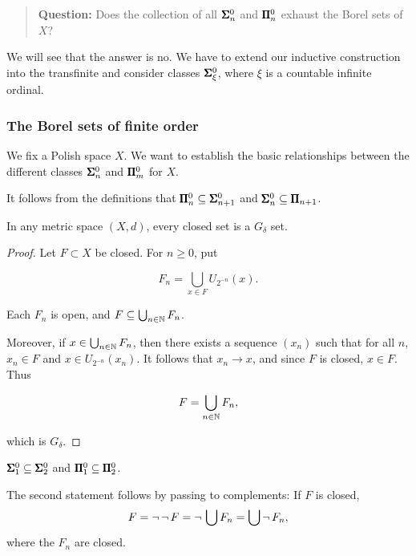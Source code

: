 \begin{quote}
\textbf{Question:} Does the collection of all $\pmb{\Sigma}^0_n$ and $\pmb{\Pi}^0_n$ exhaust the Borel sets of $X$?
\end{quote}

We will see that the answer is no. We have to extend our inductive construction into the transfinite and consider classes $\pmb{\Sigma}^0_\xi$, where $\xi$ is a countable infinite ordinal.

\subsubsection{The Borel sets of finite order}

We fix a Polish space $X$. We want to establish the basic relationships between the different classes $\pmb{\Sigma}^0_n$ and $\pmb{\Pi}^0_m$ for $X$.

It follows from the definitions that $\pmb{\Pi}^0_n \subseteq \pmb{\Sigma}^0_{n+1}$ and $\pmb{\Sigma}^0_n \subseteq \pmb{\Pi}_{n+1}$.

\begin{lemma}\label{closed-is-gdelta}In any metric space $(X,d)$, every closed set is a $G_\delta$ set.

\end{lemma}\begin{proof}Let $F \subset X$ be closed. For $n \geq 0$, put

\begin{equation}
F_n = \bigcup_{x \in F} U_{2^{-n}}(x).
\end{equation}

Each $F_n$ is open, and $F \subseteq \bigcup_{n \in \mathbb{N}} F_n$.

Moreover, if $x \in \bigcup_{n \in \mathbb{N}} F_n$, then there exists a sequence $(x_n)$ such that for all $n$, $x_n \in F$ and $x \in U_{2^{ -n}}(x_n)$. It follows that $x_n \to x$, and since $F$ is closed, $x\in F$. Thus

\begin{equation}
F = \bigcup_{n \in \mathbb{N}} F_n,
\end{equation}

which is $G_\delta$.

\end{proof}\begin{corollary}\label{cor-weak-borel-hierarchy-1}$\pmb{\Sigma}^0_1 \subseteq \pmb{\Sigma}^0_2$ and $\pmb{\Pi}^0_1 \subseteq \pmb{\Pi}^0_2$.

\end{corollary}The second statement follows by passing to complements: If $F$ is closed,
\begin{equation*}
F = \neg \, \neg \, F = \neg \, \bigcup F_n = \bigcup \neg \, F_n,
\end{equation*}
where the $F_n$ are closed.

